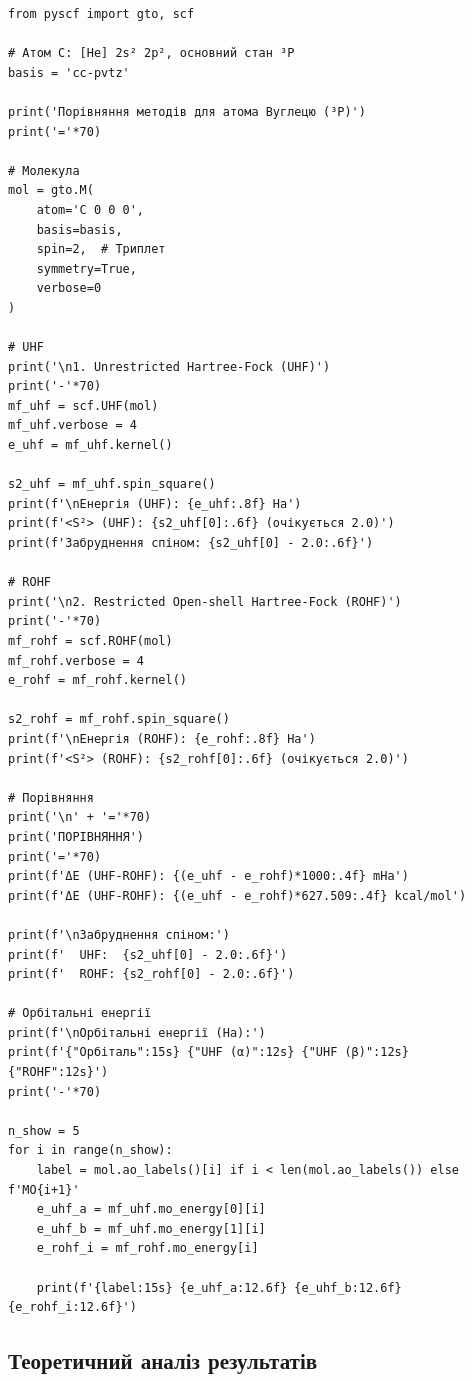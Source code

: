 \begin{verbatim}
from pyscf import gto, scf

# Атом C: [He] 2s² 2p², основний стан ³P
basis = 'cc-pvtz'

print('Порівняння методів для атома Вуглецю (³P)')
print('='*70)

# Молекула
mol = gto.M(
    atom='C 0 0 0',
    basis=basis,
    spin=2,  # Триплет
    symmetry=True,
    verbose=0
)

# UHF
print('\n1. Unrestricted Hartree-Fock (UHF)')
print('-'*70)
mf_uhf = scf.UHF(mol)
mf_uhf.verbose = 4
e_uhf = mf_uhf.kernel()

s2_uhf = mf_uhf.spin_square()
print(f'\nЕнергія (UHF): {e_uhf:.8f} Ha')
print(f'<S²> (UHF): {s2_uhf[0]:.6f} (очікується 2.0)')
print(f'Забруднення спіном: {s2_uhf[0] - 2.0:.6f}')

# ROHF
print('\n2. Restricted Open-shell Hartree-Fock (ROHF)')
print('-'*70)
mf_rohf = scf.ROHF(mol)
mf_rohf.verbose = 4
e_rohf = mf_rohf.kernel()

s2_rohf = mf_rohf.spin_square()
print(f'\nЕнергія (ROHF): {e_rohf:.8f} Ha')
print(f'<S²> (ROHF): {s2_rohf[0]:.6f} (очікується 2.0)')

# Порівняння
print('\n' + '='*70)
print('ПОРІВНЯННЯ')
print('='*70)
print(f'ΔE (UHF-ROHF): {(e_uhf - e_rohf)*1000:.4f} mHa')
print(f'ΔE (UHF-ROHF): {(e_uhf - e_rohf)*627.509:.4f} kcal/mol')

print(f'\nЗабруднення спіном:')
print(f'  UHF:  {s2_uhf[0] - 2.0:.6f}')
print(f'  ROHF: {s2_rohf[0] - 2.0:.6f}')

# Орбітальні енергії
print(f'\nОрбітальні енергії (Ha):')
print(f'{"Орбіталь":15s} {"UHF (α)":12s} {"UHF (β)":12s} {"ROHF":12s}')
print('-'*70)

n_show = 5
for i in range(n_show):
    label = mol.ao_labels()[i] if i < len(mol.ao_labels()) else f'MO{i+1}'
    e_uhf_a = mf_uhf.mo_energy[0][i]
    e_uhf_b = mf_uhf.mo_energy[1][i]
    e_rohf_i = mf_rohf.mo_energy[i]

    print(f'{label:15s} {e_uhf_a:12.6f} {e_uhf_b:12.6f} {e_rohf_i:12.6f}')
\end{verbatim}

\subsection{Теоретичний аналіз результатів}

